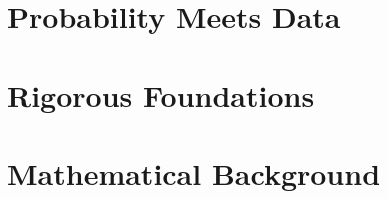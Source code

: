 \documentclass[11pt]{book}
\begin{document}
\part{Probability Meets Data}







\part{Rigorous Foundations}




\part{Mathematical Background}


\end{document}
